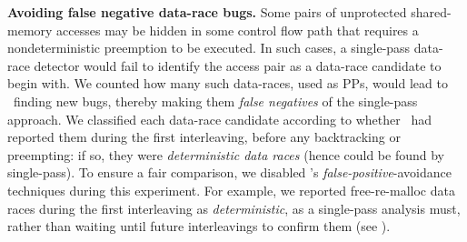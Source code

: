 {\bf Avoiding false negative data-race bugs.}
\label{sec:eval-falseneg}
Some pairs of unprotected shared-memory accesses may be hidden in some control flow path that requires a nondeterministic preemption to be executed.
In such cases, a single-pass data-race detector
would fail
to identify the access pair as a data-race candidate to begin with.
%
We counted how many such data-races, used as PPs, would lead to \landslide~finding new bugs,
thereby making them {\em false negatives} of the single-pass approach.
We classified each data-race candidate according to whether \landslide~had reported them during the first interleaving, before any backtracking or preempting: if so, they were {\em deterministic data races} (hence could be found by single-pass).
%
To ensure a fair comparison, we disabled \landslide's {\em false-positive}-avoidance techniques during this experiment.
For example, we reported free-re-malloc data races during the first interleaving as {\em deterministic}, as a single-pass analysis must, rather than waiting until future interleavings to confirm them (see \sect{\ref{sec:free-re-malloc}}).


